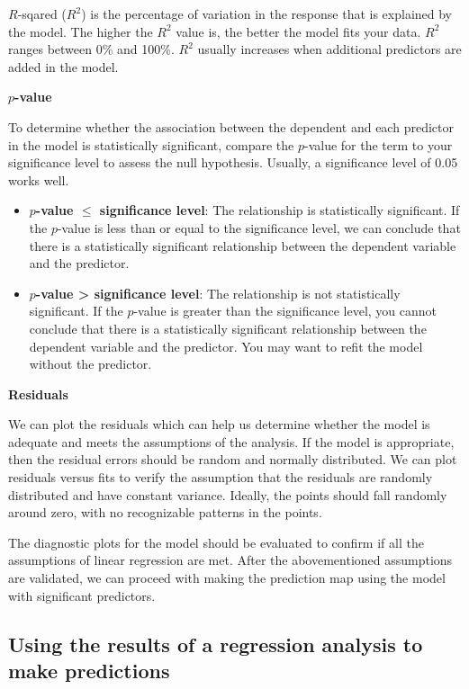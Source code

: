 \documentclass[10pt,b5paper,]{book}
\providecommand{\tightlist}{%
  \setlength{\itemsep}{0pt}\setlength{\parskip}{0pt}}
\theoremstyle{definition}
\theoremstyle{definition}
\theoremstyle{definition}
\theoremstyle{remark}
\begin{document}
\(R\)-sqared (\(R^2\)) is the percentage of variation in the response
that is explained by the model. The higher the \(R^2\) value is, the
better the model fits your data. \(R^2\) ranges between 0\% and 100\%.
\(R^2\) usually increases when additional predictors are added in the
model.

\textbf{\(p\)-value}

To determine whether the association between the dependent and each
predictor in the model is statistically significant, compare the
\(p\)-value for the term to your significance level to assess the null
hypothesis. Usually, a significance level of 0.05 works well.

\begin{itemize}
\tightlist
\item
  \textbf{\(p\)-value \(\leq\) significance level}: The relationship is
  statistically significant. If the \(p\)-value is less than or equal to
  the significance level, we can conclude that there is a statistically
  significant relationship between the dependent variable and the
  predictor.
\item
  \textbf{\(p\)-value \textgreater{} significance level}: The
  relationship is not statistically significant. If the \(p\)-value is
  greater than the significance level, you cannot conclude that there is
  a statistically significant relationship between the dependent
  variable and the predictor. You may want to refit the model without
  the predictor.
\end{itemize}

\textbf{Residuals}

We can plot the residuals which can help us determine whether the model
is adequate and meets the assumptions of the analysis. If the model is
appropriate, then the residual errors should be random and normally
distributed. We can plot residuals versus fits to verify the assumption
that the residuals are randomly distributed and have constant variance.
Ideally, the points should fall randomly around zero, with no
recognizable patterns in the points.

The diagnostic plots for the model should be evaluated to confirm if all
the assumptions of linear regression are met. After the abovementioned
assumptions are validated, we can proceed with making the prediction map
using the model with significant predictors.

\hypertarget{using-the-results-of-a-regression-analysis-to-make-predictions}{%
\subsection{Using the results of a regression analysis to make
predictions}\label{using-the-results-of-a-regression-analysis-to-make-predictions}}
\end{document}
